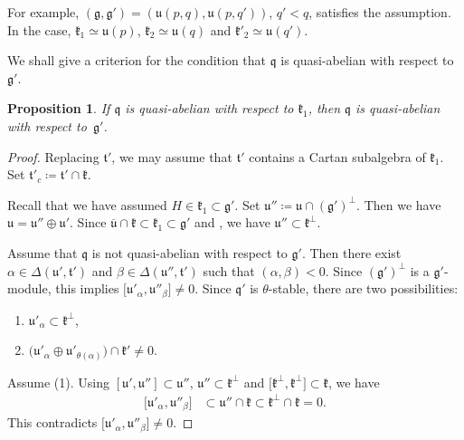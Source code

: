\documentclass[pdftex]{sigma}
\numberwithin{equation}{section}
\newtheorem{Proposition}[Theorem]{Proposition}
\theoremstyle{definition}
\newcommand{\classicalg}[1]{\mathfrak{#1}}
\newcommand{\lie}[1]{\mathfrak{#1}}
\newcommand{\lieU}{\classicalg{u}}
\begin{document}
For example, $(\lie{g}, \lie{g'}) = (\lieU(p, q), \lieU(p, q'))$, $q' < q$, satisfies the assumption.
In the case, ${\lie{k}_1 \simeq \lieU(p)}$, $\lie{k}_2 \simeq \lieU(q)$ and $\lie{k}'_2 \simeq \lieU(q')$.

We shall give a criterion for the condition that $\lie{q}$ is quasi-abelian with respect to $\lie{g'}$.

\begin{Proposition}\label{prop:QuasiAbelianZuckerman}
	If $\lie{q}$ is quasi-abelian with respect to $\lie{k}_1$, then $\lie{q}$ is quasi-abelian with respect to~$\lie{g'}$.
\end{Proposition}

\begin{proof}
	Replacing $\lie{t'}$, we may assume that $\lie{t'}$ contains a Cartan subalgebra of $\lie{k}_1$.
	Set $\lie{t}'_{c}\coloneq\lie{t}'\cap \lie{k}$.

	Recall that we have assumed $H \in \lie{k}_1 \subset \lie{g'}$.
	Set $\lie{u}''\coloneq \lie{u}\cap (\lie{g'})^{\perp}$.
	Then we have $\lie{u} = \lie{u}'' \oplus \lie{u}'$.
	Since $\lie{\overline{u}}\cap \lie{k}\subset \lie{k}_1\subset \lie{g'}$ and \smash{$\lie{u} = (\lie{u}\cap \lie{k}) \oplus \bigl(\lie{u} \cap \lie{k}^\perp\bigr)$}, we have $\lie{u}'' \subset \lie{k}^{\perp}$.

	Assume that $\lie{q}$ is not quasi-abelian with respect to $\lie{g}'$.
	Then there exist $\alpha \in \Delta(\lie{u'}, \lie{t'})$ and $\beta \in \Delta(\lie{u''}, \lie{t'})$
	such that $(\alpha, \beta) < 0$.
	Since $(\lie{g'})^{\perp}$ is a $\lie{g}'$-module, this implies $\bigl[\lie{u}'_{\alpha}, \lie{u}''_{\beta}\bigr] \neq 0$.
	Since $\lie{q}'$ is $\theta$-stable, there are two possibilities:
	\begin{enumerate}\itemsep=0pt
		\item[(1)] $\lie{u}'_{\alpha} \subset \lie{k}^{\perp}$,
		\item[(2)] $\bigl(\lie{u}'_{\alpha}\oplus \lie{u}'_{\theta(\alpha)}\bigr) \cap \lie{k}'\neq 0$.
	\end{enumerate}

	Assume (1).
	Using $[\lie{u}', \lie{u}'']\subset \lie{u}''$, $\lie{u}'' \subset \lie{k}^{\perp}$ and $\bigl[\lie{k}^{\perp}, \lie{k}^{\perp}\bigr] \subset \lie{k}$,
	we have
	\begin{align*}
	\bigl[\lie{u}'_{\alpha}, \lie{u}''_{\beta}\bigr] &\subset \lie{u}'' \cap \lie{k}
	\subset \lie{k}^{\perp} \cap \lie{k} =0.
	\end{align*}
	This contradicts $\bigl[\lie{u}'_{\alpha}, \lie{u}''_{\beta}\bigr] \neq 0$.


\end{proof}
\end{document}
